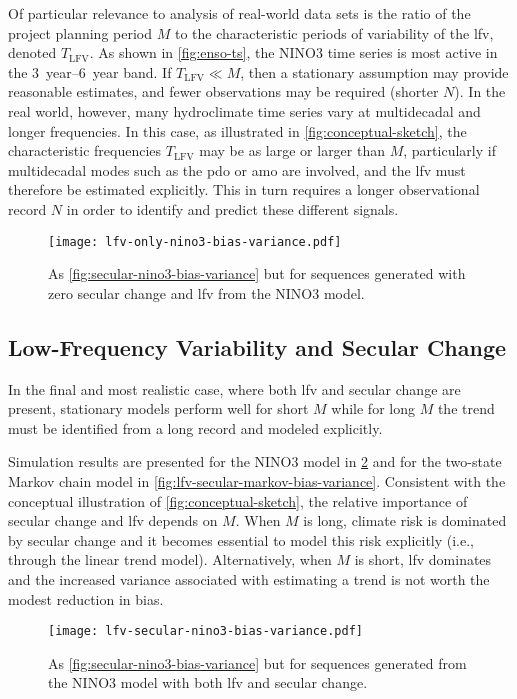 \documentclass[
]{agujournal2018}
\makeatletter
\newcommand{\ie}{i.e.\@\xspace}
\makeatother
\begin{document}
Of particular relevance to analysis of real-world data sets is the ratio of the project planning period $M$ to the characteristic periods of variability of the \gls{lfv}, denoted $T_{\text{LFV}}$.
As shown in \cref{fig:enso-ts}, the NINO3 time series is most active in the \SIrange{3}{6}{year} band.
If $T_{\text{LFV}} \ll M$, then a stationary assumption may provide reasonable estimates, and fewer observations may be required (shorter $N$).
In the real world, however, many hydroclimate time series vary at multidecadal and longer frequencies.
In this case, as illustrated in \cref{fig:conceptual-sketch}, the characteristic frequencies $T_{\text{LFV}}$ may be as large or larger than $M$, particularly if multidecadal modes such as the \gls{pdo} or \gls{amo} are involved, and the \gls{lfv} must therefore be estimated explicitly.
This in turn requires a longer observational record $N$ in order to identify and predict these different signals.

\begin{figure}
  \centering
  \texttt{[image: lfv-only-nino3-bias-variance.pdf]}
  \caption{
    As \cref{fig:secular-nino3-bias-variance} but for sequences generated with zero secular change and \gls{lfv} from the NINO3 model.
  }\label{fig:lfv-nino3-bias-variance}
\end{figure}

\subsection{Low-Frequency Variability and Secular Change}

In the final and most realistic case, where both \gls{lfv} and secular change are present, stationary models perform well for short $M$ while for long $M$ the trend must be identified from a long record and modeled explicitly.

Simulation results are presented for the NINO3 model in \cref{fig:lfv-secular-nino3-bias-variance} and for the two-state Markov chain model in \cref{fig:lfv-secular-markov-bias-variance}.
Consistent with the conceptual illustration of \cref{fig:conceptual-sketch}, the relative importance of secular change and \gls{lfv} depends on $M$.
When $M$ is long, climate risk is dominated by secular change and it becomes essential to model this risk explicitly (\ie, through the linear trend model).
Alternatively, when $M$ is short, \gls{lfv} dominates and the increased variance associated with estimating a trend is not worth the modest reduction in bias.
\begin{figure}
  \centering
  \texttt{[image: lfv-secular-nino3-bias-variance.pdf]}
  \caption{
    As \cref{fig:secular-nino3-bias-variance} but for sequences generated from the NINO3 model with both \gls{lfv} and secular change.
  }\label{fig:lfv-secular-nino3-bias-variance}
\end{figure}
\end{document}

